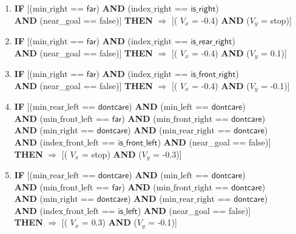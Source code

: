 \begin{enumerate}
	\item \textbf{IF} [($\text{min\_right}$ == $\textsf{far}$) \textbf{AND} ($\text{index\_right}$ == $\textsf{is\_right}$)\\
	\textbf{AND} (near\_goal == \textsf{false})]
	\textbf{THEN} $\Rightarrow$ [( $V_x$ = \textsf{-0.4}) \textbf{AND} ($V_y$ = \textsf{stop})]
	
	\item \textbf{IF} [($\text{min\_right}$ == $\textsf{far}$) \textbf{AND} ($\text{index\_right}$ == $\textsf{is\_rear\_right}$)\\
	\textbf{AND} (near\_goal == \textsf{false})]
	\textbf{THEN} $\Rightarrow$ [( $V_x$ = \textsf{-0.4}) \textbf{AND} ($V_y$ = \textsf{0.1})]
	
	\item \textbf{IF} [($\text{min\_right}$ == $\textsf{far}$) \textbf{AND} ($\text{index\_right}$ == $\textsf{is\_front\_right}$)\\
	\textbf{AND} (near\_goal == \textsf{false})]
	\textbf{THEN} $\Rightarrow$ [( $V_x$ = \textsf{-0.4}) \textbf{AND} ($V_y$ = \textsf{-0.1})]
	
	\item \textbf{IF} [($\text{min\_rear\_left}$ == $\textsf{dontcare}$) 
	\textbf{AND} ($\text{min\_left}$ == $\textsf{dontcare}$)\\
	\textbf{AND} ($\text{min\_front\_left}$ == $\textsf{far}$)
	\textbf{AND} ($\text{min\_front\_right}$ == $\textsf{dontcare}$)\\
	\textbf{AND} ($\text{min\_right}$ == $\textsf{dontcare}$) 
	\textbf{AND} ($\text{min\_rear\_right}$ == $\textsf{dontcare}$) \\
	\textbf{AND} ($\text{index\_front\_left}$ == $\textsf{is\_front\_left}$)
	\textbf{AND} (near\_goal == \textsf{false})]\\
	\textbf{THEN} $\Rightarrow$ [( $V_x$ = \textsf{stop}) \textbf{AND} ($V_y$ = \textsf{-0.3})]

	\item \textbf{IF} [($\text{min\_rear\_left}$ == $\textsf{dontcare}$) 
	\textbf{AND} ($\text{min\_left}$ == $\textsf{dontcare}$)\\
	\textbf{AND} ($\text{min\_front\_left}$ == $\textsf{far}$)
	\textbf{AND} ($\text{min\_front\_right}$ == $\textsf{dontcare}$)\\
	\textbf{AND} ($\text{min\_right}$ == $\textsf{dontcare}$) 
	\textbf{AND} ($\text{min\_rear\_right}$ == $\textsf{dontcare}$) \\
	\textbf{AND} ($\text{index\_front\_left}$ == $\textsf{is\_left}$)
	\textbf{AND} (near\_goal == \textsf{false})]\\
	\textbf{THEN} $\Rightarrow$ [( $V_x$ = \textsf{0.3}) \textbf{AND} ($V_y$ = \textsf{-0.1})]
	

\end{enumerate}
